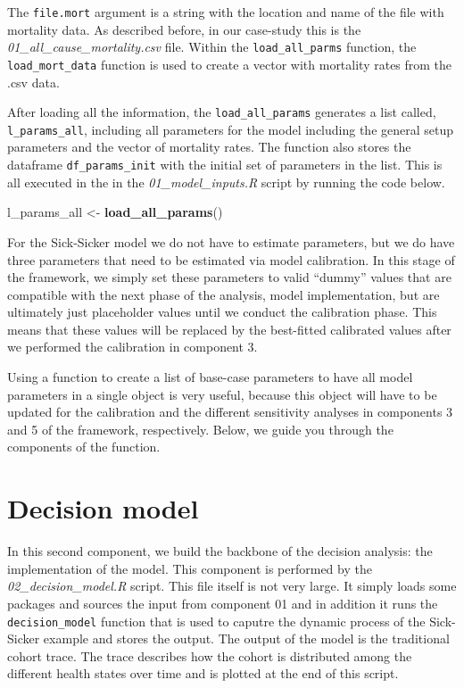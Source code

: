\documentclass[
]{book}
\newenvironment{Shaded}{\begin{snugshade}}{\end{snugshade}}
\newcommand{\FunctionTok}[1]{\textcolor[rgb]{0.13,0.29,0.53}{\textbf{#1}}}
\newcommand{\NormalTok}[1]{#1}
\newcommand{\OtherTok}[1]{\textcolor[rgb]{0.56,0.35,0.01}{#1}}
\begin{document}
The \texttt{file.mort} argument is a string with the location and name of the file with mortality data. As described before, in our case-study this is the \emph{01\_all\_cause\_mortality.csv} file. Within the \texttt{load\_all\_parms} function, the \texttt{load\_mort\_data} function is used to create a vector with mortality rates from the .csv data.

After loading all the information, the \texttt{load\_all\_params} generates a list called, \texttt{l\_params\_all}, including all parameters for the model including the general setup parameters and the vector of mortality rates. The function also stores the dataframe \texttt{df\_params\_init} with the initial set of parameters in the list. This is all executed in the in the \emph{01\_model\_inputs.R} script by running the code below.

\begin{Shaded}
\begin{Highlighting}[]
\NormalTok{l\_params\_all }\OtherTok{\textless{}{-}} \FunctionTok{load\_all\_params}\NormalTok{()}
\end{Highlighting}
\end{Shaded}

For the Sick-Sicker model we do not have to estimate parameters, but we do have three parameters that need to be estimated via model calibration. In this stage of the framework, we simply set these parameters to valid ``dummy'' values that are compatible with the next phase of the analysis, model implementation, but are ultimately just placeholder values until we conduct the calibration phase. This means that these values will be replaced by the best-fitted calibrated values after we performed the calibration in component 3.

Using a function to create a list of base-case parameters to have all model parameters in a single object is very useful, because this object will have to be updated for the calibration and the different sensitivity analyses in components 3 and 5 of the framework, respectively. Below, we guide you through the components of the function.

\chapter{Decision model}\label{simulation}

In this second component, we build the backbone of the decision analysis: the implementation of the model. This component is performed by the \emph{02\_decision\_model.R} script. This file itself is not very large. It simply loads some packages and sources the input from component 01 and in addition it runs the \texttt{decision\_model} function that is used to caputre the dynamic process of the Sick-Sicker example and stores the output. The output of the model is the traditional cohort trace. The trace describes how the cohort is distributed among the different health states over time and is plotted at the end of this script.
\end{document}
